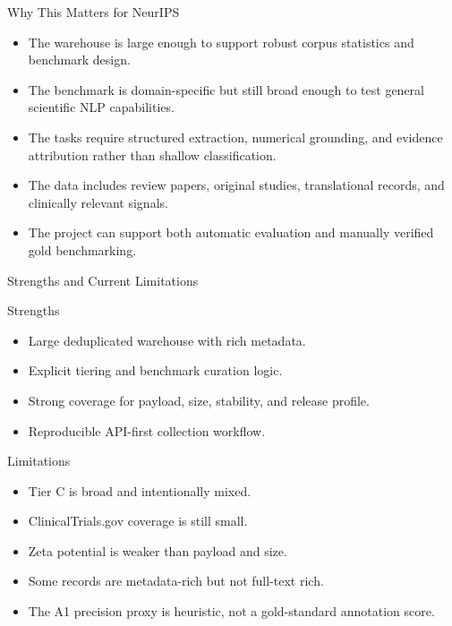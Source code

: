 \documentclass[aspectratio=169]{beamer}
\begin{document}
\begin{frame}{Why This Matters for NeurIPS}
\begin{itemize}
    \item The warehouse is large enough to support robust corpus statistics and benchmark design.
    \item The benchmark is domain-specific but still broad enough to test general scientific NLP capabilities.
    \item The tasks require structured extraction, numerical grounding, and evidence attribution rather than shallow classification.
    \item The data includes review papers, original studies, translational records, and clinically relevant signals.
    \item The project can support both automatic evaluation and manually verified gold benchmarking.
\end{itemize}
\end{frame}

\begin{frame}{Strengths and Current Limitations}
\begin{block}{Strengths}
\begin{itemize}
    \item Large deduplicated warehouse with rich metadata.
    \item Explicit tiering and benchmark curation logic.
    \item Strong coverage for payload, size, stability, and release profile.
    \item Reproducible API-first collection workflow.
\end{itemize}
\end{block}
\begin{block}{Limitations}
\begin{itemize}
    \item Tier C is broad and intentionally mixed.
    \item ClinicalTrials.gov coverage is still small.
    \item Zeta potential is weaker than payload and size.
    \item Some records are metadata-rich but not full-text rich.
    \item The A1 precision proxy is heuristic, not a gold-standard annotation score.
\end{itemize}
\end{block}
\end{frame}
\end{document}
